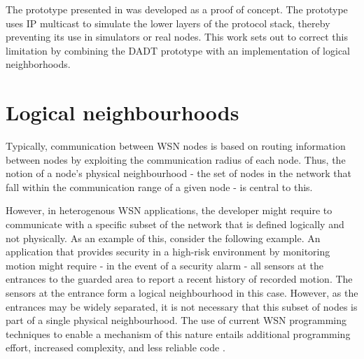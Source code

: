 The prototype presented in \cite{migliavacca_DADT:2006} was developed as a proof of 
concept. The prototype uses IP multicast to simulate the lower layers of the 
protocol stack, thereby preventing its use in simulators or real nodes. This 
work sets out to correct this limitation by combining the DADT prototype with 
an implementation of logical neighborhoods. %

\section {Logical neighbourhoods} \label{LNDescription}

Typically, communication between WSN nodes is based on routing 
information between nodes by exploiting the communication radius of each node.
Thus, the notion of a node's physical neighbourhood - the set of nodes in the
network
that fall within the communication range of a given node - is central to this.

However, in heterogenous WSN applications, the developer might require to
communicate with a specific subset of the network that is defined logically and
not physically. As an example of this, consider the following example. An
application that provides security in a high-risk environment by monitoring 
motion might require - in the event of a security alarm - all sensors at the
entrances to the guarded area to report a recent history of recorded motion.
The sensors at the entrance form a logical neighbourhood in this case. However,
as the entrances may be widely separated, it is not necessary that this subset
of nodes is part of a single physical neighbourhood. The use of current WSN
programming techniques to enable a mechanism of this nature entails additional
programming effort, increased complexity, and less reliable code
\cite{mottola_LN:2006}.  


